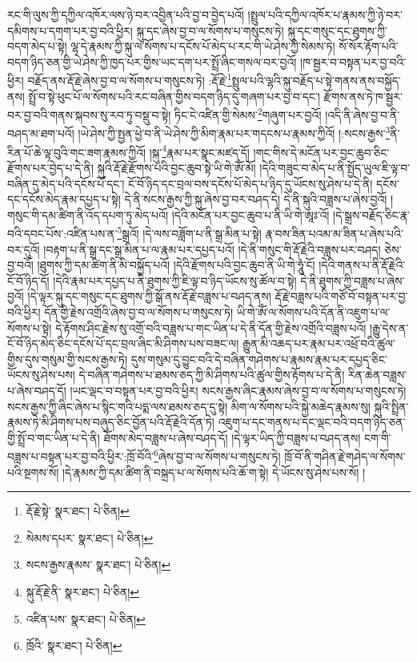 རང་གི་ལུས་ཀྱི་དཀྱིལ་འཁོར་ལས་ཉེ་བར་འབྱིན་པའི་བྱ་བ་བྱེད་པའོ། །སྤྲུལ་པའི་དཀྱིལ་འཁོར་པ་རྣམས་ཀྱི་ཉེ་བར་དམིགས་པ་དགག་པར་བྱ་བའི་ཕྱིར། སྐུ་དང་ཞེས་བྱ་བ་ལ་སོགས་པ་གསུངས་ཏེ། སྐུ་དང་གསུང་དང་ཐུགས་ཀྱི་བདག་མེད་པ་སྟེ། ལྷ་དེ་རྣམས་ཀྱི་སྐུ་ལ་སོགས་པ་དངོས་པོ་མེད་པ་རང་གི་ཡེ་ཤེས་ཀྱི་སེམས་ཏེ། སོ་སོར་རྟོག་པའི་བདག་ཉིད་ཅན་གྱི་ཡེ་ཤེས་ཀྱི་ཁྱད་པར་གྱིས་ཡང་དག་པར་སྤྲོ་ཞིང་གསལ་བར་བྱའོ། །ཁ་སྦྱར་བ་བསྟན་པར་བྱ་བའི་ཕྱིར། བརྗོད་ནས་རྡོ་རྗེ་ཞེས་བྱ་བ་ལ་སོགས་པ་གསུངས་ཏེ། :རྡོ་རྗེ་\footnote{རྡོ་རྗེ་སྟེ་  སྣར་ཐང་།  པེ་ཅིན། }སྤྲུལ་པའི་ལྷའི་སྐུ་བརྗོད་པ་སྟེ་གནས་ནས་བསྐྱོད་ནས། སྤྲོ་བ་སྟེ་ཕུང་པོ་ལ་སོགས་པའི་རང་བཞིན་གྱིས་བདག་ཉིད་དུ་གཞག་པར་བྱ་བ་དང་། རྫོགས་ནས་ཏེ་ཁ་སྦྱར་བར་བྱ་བའི་གནས་སྐབས་སུ་རབ་ཏུ་བསྡུ་བ་སྟེ། ཏིང་ངེ་འཛིན་གྱི་སེམས་\footnote{སེམས་དཔར་  སྣར་ཐང་།  པེ་ཅིན། }གཞུག་པར་བྱའོ། །འདི་ནི་ཞེས་བྱ་བ་ནི་བཤད་མ་ཐག་པའོ། །ཡེ་ཤེས་ཀྱི་སྤྱན་ཕྱེ་བ་ནི་ཡེ་ཤེས་ཀྱི་མིག་རྣམ་པར་གདངས་པ་རྣམས་ཀྱིའོ། །:སངས་རྒྱས་\footnote{སངས་རྒྱས་རྣམས་  སྣར་ཐང་།  པེ་ཅིན། }ནི་རིན་པོ་ཆེ་ལྟ་བུའི་གང་ཟག་རྣམས་ཀྱིའོ། །སྐུ་\footnote{སྐུ་རྡོ་རྗེ་ནི་  སྣར་ཐང་།  པེ་ཅིན། }རྣམ་པར་སྣང་མཛད་དོ། །གང་གིས་དེ་མངོན་པར་བྱང་ཆུབ་ཅིང་རྫོགས་པར་བྱེད་པ་དེ་ནི། སྐུའི་རྡོ་རྗེ་རྫོགས་པའི་བྱང་ཆུབ་སྟེ་ཡི་གེ་ཨོཾ་མོ། །དེའི་གཟུང་བ་མེད་པ་ནི་སྤྱོད་ཡུལ་ཇི་ལྟ་བ་བཞིན་དུ་མེད་པའི་དངོས་པོ་དང་། ངོ་བོ་ཉིད་དང་བྲལ་བས་དངོས་པོ་མེད་པ་ཉིད་དུ་ཡོངས་སུ་ཤེས་པ་དེ་ནི། དངོས་དང་དངོས་མེད་རྣམ་དཔྱད་པ་སྟེ། དེ་ནི་སངས་རྒྱས་ཀྱི་སྐུ་ཞེས་བྱ་བར་བཤད་དེ། དེ་ནི་སྐུའི་བཟླས་པ་ཞེས་བྱའོ། །གསུང་གི་དམ་ཚིག་ནི་འོད་དཔག་ཏུ་མེད་པའོ། །དེའི་མངོན་པར་བྱང་ཆུབ་པ་ནི་ཡི་གེ་ཨཱཿ་འོ། །དེ་སྒྲས་བརྗོད་ཅིང་རྣ་བའི་དབང་པོས་:འཛིན་པས་ན་\footnote{འཛིན་པས་  སྣར་ཐང་།  པེ་ཅིན། }སྒྲའོ། །དེ་ལས་བཟློག་པ་ནི་སྒྲ་མིན་པ་སྟེ། རྣ་བས་ཟིན་པའམ་མ་ཟིན་པ་ཞེས་པའི་བར་དུའོ། །བརྟག་པ་ནི་སྒྲ་དང་སྒྲ་མིན་པ་ལ་རྣམ་པར་དཔྱད་པའོ། །དེ་ནི་གསུང་གི་རྡོ་རྗེའི་བཟླས་པར་བཤད། ཅེས་བྱ་བའོ། །ཐུགས་ཀྱི་དམ་ཚིག་ནི་མི་བསྐྱོད་པའོ། །དེའི་རྫོགས་པའི་བྱང་ཆུབ་ནི་ཡི་གེ་ཧཱུཾ་ངོ། །དེའི་གནས་པ་ནི་རྡོ་རྗེའི་ངོ་བོ་ཉིད་དོ། །དེའི་རྣམ་པར་དཔྱད་པ་ནི་ཐུགས་ཀྱི་ཇི་ལྟ་བ་ཉིད་ཡོངས་སུ་ཚོལ་བ་སྟེ། དེ་ནི་ཐུགས་ཀྱི་བཟླས་པ་ཞེས་བྱའོ། །དེ་ལྟར་སྐུ་དང་གསུང་དང་ཐུགས་ཀྱི་སྒོ་ནས་རྡོ་རྗེ་བཟླས་པ་བཤད་ནས། རྡོ་རྗེ་བཟླས་པའི་གཙོ་བོ་བསྟན་པར་བྱ་བའི་ཕྱིར། དོན་གྱི་རྗེས་འགྲོའི་ཞེས་བྱ་བ་ལ་སོགས་པ་གསུངས་ཏེ། ཡི་གེ་ཨོཾ་ལ་སོགས་པའི་དོན་ནི་འཇུག་པ་ལ་སོགས་པ་སྟེ། དེ་རྟོགས་ཤིང་རྗེས་སུ་འགྲོ་བའི་བཟླས་པ་གང་ཡིན་པ་དེ་ནི་དོན་གྱི་རྗེས་འགྲོའི་བཟླས་པའོ། །རྒྱུ་དེས་ན་ངོ་བོ་ཉིད་མེད་ཅིང་དངོས་པོ་དང་བྲལ་ཞིང་མི་ཤིགས་པས་བཟང་ལ། རྒྱུན་མི་འཆད་པར་རྣམ་པར་འཕྲོ་བའི་ཚུལ་གྱིས་དུས་གསུམ་གྱི་སངས་རྒྱས་ཏེ། དུས་གསུམ་དུ་བྱུང་བའི་དེ་བཞིན་གཤེགས་པ་རྣམས་རྣམ་པར་དཔྱད་ཅིང་ཡོངས་སུ་ཤེས་པས། དེ་བཞིན་གཤེགས་པ་ཐམས་ཅད་ཀྱི་མི་ཤིགས་པའི་ཚུལ་གྱིས་རྟོགས་པ་དེ་ནི། རིན་ཆེན་བཟླས་པ་ཞེས་བཤད་དོ། །ཡང་ལྡང་བ་བསྟན་པར་བྱ་བའི་ཕྱིར། སངས་རྒྱས་ཞིང་རྣམས་ཞེས་བྱ་བ་ལ་སོགས་པ་གསུངས་ཏེ། སངས་རྒྱས་ཀྱི་ཞིང་ཞེས་པ་སྙིང་གའི་པདྨ་ལས་ཐམས་ཅད་དུ་སྟེ། མིག་ལ་སོགས་པའི་སྐྱེ་མཆེད་རྣམས་སུ། སྐུའི་སྤྲིན་རྣམས་ཏེ་མི་ཤིགས་པས་བཞུད་ཅིང་བྱོན་པའི་རྡོ་རྗེའི་དོན་ཏེ། འཇུག་པ་དང་གནས་པ་དང་ལྡང་བའི་བདག་ཉིད་ཅན་གྱི་སྤྲོ་བ་གང་ཡིན་པ་དེ་ནི། ཐོགས་མེད་བཟླས་པ་ཞེས་བཤད་དོ། །དེ་ལྟར་ཡིད་ཀྱི་བཟླས་པ་བཤད་ནས། ངག་གི་བཟླས་པ་བསྟན་པར་བྱ་བའི་ཕྱིར་:ཁྲོ་བོའི་\footnote{ཁྲོའི་  སྣར་ཐང་།  པེ་ཅིན། }ཞེས་བྱ་བ་ལ་སོགས་པ་གསུངས་ཏེ། ཁྲོ་བོ་ནི་གཤིན་རྗེ་གཤེད་ལ་སོགས་པའི་སྔགས་སོ། །དེ་རྣམས་ཀྱི་དམ་ཚིག་ནི་བསྐྲད་པ་ལ་སོགས་པའི་ཆོ་ག་སྟེ། དེ་ཡོངས་སུ་ཤེས་པས་སོ། །

